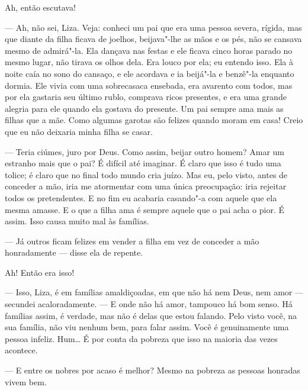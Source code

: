 Ah, então escutava!

--- Ah, não sei, Liza. Veja: conheci um pai que era uma pessoa severa,
rígida, mas que diante da filha ficava de joelhos, beijava"-lhe as mãos
e os pés, não se cansava mesmo de admirá"-la. Ela dançava nas festas e
ele ficava cinco horas parado no mesmo lugar, não tirava os olhos dela.
Era louco por ela; eu entendo isso. Ela à noite caía no sono do
cansaço, e ele acordava e ia beijá"-la e benzê"-la enquanto dormia. Ele
vivia com uma sobrecasaca ensebada, era avarento com todos, mas por ela
gastaria seu último rublo, comprava ricos presentes, e era uma grande
alegria para ele quando ela gostava do presente. Um pai sempre ama mais
as filhas que a mãe. Como algumas garotas são felizes quando moram em
casa! Creio que eu não deixaria minha filha se casar.


--- Teria ciúmes, juro por Deus. Como assim, beijar outro homem? Amar um
estranho mais que o pai? É difícil até imaginar. É claro que isso é
tudo uma tolice; é claro que no final todo mundo cria juízo. Mas eu,
pelo visto, antes de conceder a mão, iria me atormentar com uma única
preocupação: iria rejeitar todos os pretendentes. E no fim eu acabaria
casando"-a com aquele que ela mesma amasse. E o que a filha ama é sempre
aquele que o pai acha o pior. É assim. Isso causa muito mal às
famílias.

--- Já outros ficam felizes em vender a filha em vez de conceder a mão
honradamente --- disse ela de repente.

Ah! Então era isso!

--- Isso, Liza, é em famílias amaldiçoadas, em que não há nem Deus, nem
amor --- secundei acaloradamente. --- E onde não há amor, tampouco há bom
senso. Há famílias assim, é verdade, mas não é delas que estou falando.
Pelo visto você, na sua família, não viu nenhum bem, para falar
assim. Você é genuinamente uma pessoa infeliz. Hum\ldots{} É por conta da
pobreza que isso na maioria das vezes acontece.

--- E entre os nobres por acaso é melhor? Mesmo na pobreza as pessoas
honradas vivem bem.

